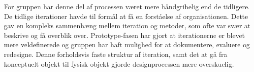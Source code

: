 For gruppen har denne del af processen været mere håndgribelig end de tidligere. De tidlige iterationer havde til formål at få en forståelse af organisationen. Dette gav en kompleks sammenhæng mellem iteration og metoder, som ofte var svær at beskrive og få overblik over. Prototype-fasen har gjort at iterationerne er blevet mere veldefinerede og gruppen har haft mulighed for at dokumentere, evaluere og redesigne. Denne forholdsvis faste struktur af iteration, samt det at gå fra konceptuelt objekt til fysisk objekt gjorde designprocessen mere overskuelig. 




